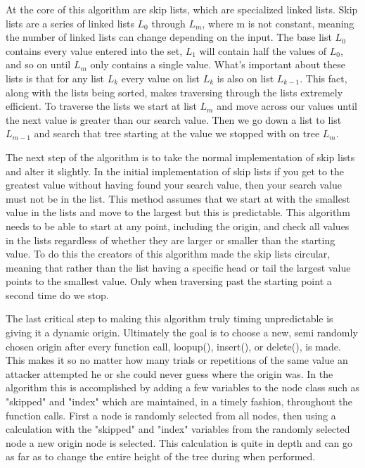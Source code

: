 \documentclass[11pt]{article}
\begin{document}
	At the core of this algorithm are skip lists, which are specialized linked lists. 
Skip lists are a series of linked lists $L_{0}$ through $L_{m}$, where m is not constant, meaning the number of linked lists can change depending on the input. The base list $L_{0}$ contains every value entered into the set, $L_{1}$ will contain half the values of $L_{0}$, and so on until $L_{m}$ only contains a single value. What's important about these lists is that for any list $L_{k}$ every value on list $L_{k}$ is also on list $L_{k-1}$. This fact, along with the lists being sorted, makes traversing through the lists extremely efficient. To traverse the 
lists we start at list $L_{m}$ and move across our values until the next value is greater 
than our search value. Then we go down a list to list $L_{m-1}$ and search that tree starting 
at the value we stopped with on tree $L_{m}$. 

	The next step of the algorithm is to take the normal implementation of skip 
lists and alter it slightly. In the initial implementation of skip lists if you
get to the greatest value without having found your search value, then your search value must not 
be in the list. This method assumes that we start at with the smallest value in 
the lists and move to the largest but this is predictable. This algorithm 
needs to be able to start at any point, including the origin, and check all values in the 
lists regardless of whether they are larger or smaller than the starting value. To do this the creators of this 
algorithm made the skip lists circular, meaning that rather than the list having a specific head or tail the largest value points to the smallest value. Only when traversing past the starting point a second time do we stop.
  
	The last critical step to making this algorithm truly timing unpredictable is giving it a 
dynamic origin. Ultimately the goal is to choose a new, semi randomly chosen 
origin after every function call, loopup(), insert(), or delete(), is made. This 
makes it so no matter how many trials or repetitions of the same value an attacker 
attempted he or she could never guess where the origin was. In the algorithm this is accomplished 
by adding a few variables to the node class such as "skipped" and "index" which are maintained, 
in a timely fashion, throughout the function calls. First a node is randomly selected from 
all nodes, then using a calculation with the "skipped" and "index" variables from the 
randomly selected node a new origin node is selected. This calculation is quite in depth 
and can go as far as to change the entire height of the tree during when performed. 
\end{document}
